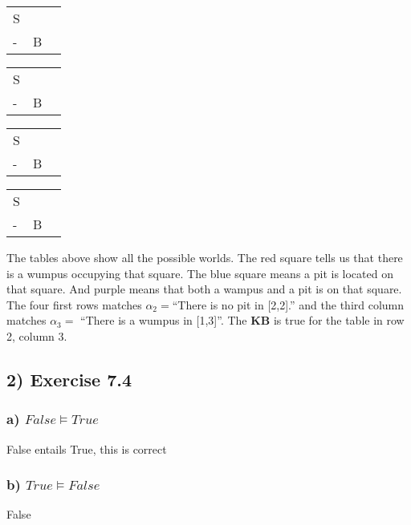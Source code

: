 \documentclass{article}
\newcommand{\pit}{\cellcolor{newblue}}
\newcommand{\wompit}{\cellcolor{newpurple}}
\begin{document}
	\begin{center}
		\begin{tabular}{|m{0.25cm}|m{0.25cm}|m{0.25cm}|}
			\hline
			\pit &&  \\ \hline
			S & \pit &\\ \hline
			- & B & \wompit \\ \hline
		\end{tabular}
		\quad
		\begin{tabular}{|m{0.25cm}|m{0.25cm}|m{0.25cm}|}
			\hline
			\pit &&  \\ \hline
			S & \wompit & \\ \hline
			- & B & \pit \\ \hline
		\end{tabular}
		\quad
		\begin{tabular}{|m{0.25cm}|m{0.25cm}|m{0.25cm}|}
			\hline
			\wompit &&  \\ \hline
			S & \pit & \\ \hline
			- & B & \pit \\ \hline
		\end{tabular}
		\quad
		\begin{tabular}{|m{0.25cm}|m{0.25cm}|m{0.25cm}|}
			\hline
			\pit &&  \\ \hline
			S & \pit & \\ \hline
			- & B & \pit \\ \hline
		\end{tabular}
	\end{center}

	The tables above show all the possible worlds. The red square tells us that there is a wumpus occupying that square. The blue square means a pit is located on that square. And purple means that both a wampus and a pit is on that square. The four first rows matches  	\(\alpha_2 = \)``There is no pit in [2,2].'' and the third column matches \(\alpha_3 =\) ``There is a wumpus in [1,3]''. The \textbf{KB} is true for the table in row 2, column 3.

\subsection*{2) Exercise 7.4}
	\subsubsection*{a) \(False \models True\)}
	False entails True, this is correct
	\subsubsection*{b) \(True \models False\)}
	False
\end{document}
